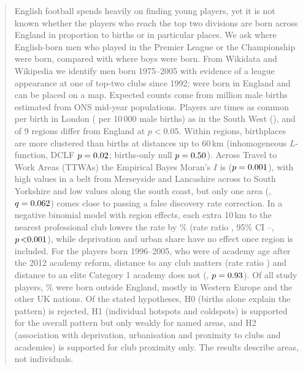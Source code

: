 \begin{abstract}
\noindent
English football spends heavily on finding young players, yet it is not known whether the players who reach the top two divisions are born across England in proportion to births or in particular places. We ask where English-born men who played in the Premier League or the Championship were born, compared with where boys were born. From Wikidata and Wikipedia we identify \nStudy{} men born 1975--2005 with evidence of a league appearance at one of \nClubsTopTwo{} top-two clubs since 1992; \nEnglish{} were born in England and \nMapped{} can be placed on a map. Expected counts come from \birthsTotal{} million male births estimated from ONS mid-year populations. Players are \regionRatio{} times as common per birth in London (\londonRate{} per 10\,000 male births) as in the South West (\swRate{}), and \nRegionsSig{} of 9 regions differ from England at $p<0.05$. Within regions, birthplaces are more clustered than births at distances up to 60\,km (inhomogeneous $L$-function, DCLF $p=\lDCLFall{}$; births-only null $p=\lNullAll{}$). Across Travel to Work Areas (TTWAs) the Empirical Bayes Moran's $I$ is \moranTTWA{} ($p=\moranTTWAp{}$), with high values in a belt from Merseyside and Lancashire across to South Yorkshire and low values along the south coast, but only one area (\giTopName{}, $q=\giTopQ{}$) comes close to passing a false discovery rate correction. In a negative binomial model with region effects, each extra 10\,km to the nearest professional club lowers the rate by \distPct{}\% (rate ratio \distRR{}, 95\% CI \distLo{}--\distHi{}, $p\,\distP{}$), while deprivation and urban share have no effect once region is included. For the \nAcadPlayers{} players born 1996--2005, who were of academy age after the 2012 academy reform, distance to any club matters (rate ratio \clubYoungRR{}) and distance to an elite Category 1 academy does not (\acadRR{}, $p=\acadP{}$). Of all \nStudy{} study players, \shareOutsideEngland\% were born outside England, mostly in Western Europe and the other UK nations. Of the stated hypotheses, H0 (births alone explain the pattern) is rejected, H1 (individual hotspots and coldspots) is supported for the overall pattern but only weakly for named areas, and H2 (association with deprivation, urbanisation and proximity to clubs and academies) is supported for club proximity only. The results describe areas, not individuals.
\end{abstract}

